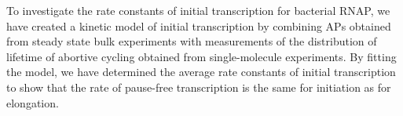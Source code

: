 To investigate the rate constants of initial transcription for bacterial RNAP,
we have created a kinetic model of initial transcription by combining APs
obtained from steady state bulk experiments with measurements of the
distribution of lifetime of abortive cycling obtained from single-molecule
experiments. By fitting the model, we have determined the average rate
constants of initial transcription to show that the rate of pause-free
transcription is the same for initiation as for elongation.
